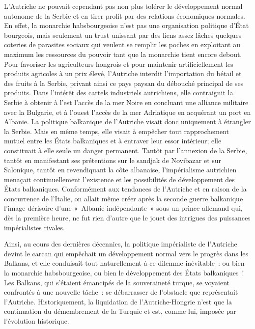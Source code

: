 \documentclass[french,twoside]{book} %
\begin{document}
L'Autriche ne pouvait cependant pas non plus tolérer le développement normal autonome de la Serbie et en tirer profit par des relations économiques normales. En effet, la monarchie habsbourgeoise n’est pas une organisation politique d’État bourgeois, mais seulement un trust unissant par des liens assez lâches quelques coteries de parasites sociaux qui veulent se remplir les poches en exploitant au maximum les ressources du pouvoir tant que la monarchie tient encore debout. Pour favoriser les agriculteurs hongrois et pour maintenir artificiellement les produits agricoles à un prix élevé, l’Autriche interdit l’importation du bétail et des fruits à la Serbie, privant ainsi ce pays paysan du débouché principal de ses produits. Dans l’intérêt des cartels industriels autrichiens, elle contraignit la Serbie à obtenir à l’est l’accès de la mer Noire en concluant une alliance militaire avec la Bulgarie, et à l’ouest l’accès de la mer Adriatique en acquérant un port en Albanie. La politique balkanique de l’Autriche visait donc uniquement à étrangler la Serbie. Mais en même temps, elle visait à empêcher tout rapprochement mutuel entre les États balkaniques et à entraver leur essor intérieur; elle constituait à elle seule un danger permanent. Tantôt par l’annexion de la Serbie, tantôt en manifestant ses prétentions sur le sandjak de Novibazar et sur Salonique, tantôt en revendiquant la côte albanaise, l’impérialisme autrichien menaçait continuellement l’existence et les possibilités de développement des États balkaniques. Conformément aux tendances de l’Autriche et en raison de la concurrence de l’Italie, on allait même créer après la seconde guerre balkanique l’image dérisoire d’une « Albanie indépendante » sous un prince allemand qui, dès la première heure, ne fut rien d’autre que le jouet des intrigues des puissances impérialistes rivales.\par
Ainsi, au cours des dernières décennies, la politique impérialiste de l’Autriche devint le carcan qui empêchait un développement normal vers le progrès dans les Balkans, et elle conduisait tout naturellement à ce dilemme inévitable : ou bien la monarchie habsbourgeoise, ou bien le développement des États balkaniques ! Les Balkans, qui s’étaient émancipés de la souveraineté turque, se voyaient confrontés à une nouvelle tâche : se débarrasser de l’obstacle que représentait l’Autriche. Historiquement, la liquidation de l’Autriche-Hongrie n’est que la continuation du démembrement de la Turquie et est, comme lui, imposée par l’évolution historique.\par
\end{document}
